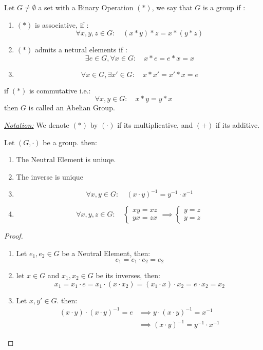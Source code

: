 \begin{definition}[Group]
Let $G \neq \emptyset  $ a set with a Binary Operation $(*)$, we say that 
$G $ is a group if : 
\begin{enumerate}
\item $(*)$ is associative, if : 
  \[
  \forall x,y,z \in  G: \quad (x * y ) * z  = x * (y * z) 
  \]
  \item $(*)  $   admits a netural elements  if :
    \[
      \exists e \in  G, \forall x \in G: \quad 
      x * e = e * x = x
    \]
    \item \[
    \forall x \in  G, \exists x' \in G: \quad  x * x' = 
    x' * x = e
    \]
\end{enumerate}
if $(*)$ is commutative i.e.:
\[
\forall x,y \in  G: \quad x * y = y * x
\]
then $G $ is called an Abelian Group. \\
\end{definition}
\underline{\emph{Notation:}} We denote $(*) $ by $(\cdot)$  if its multiplicative,
and $(+) $ if its additive.
\begin{proposition}
  Let $(G, \cdot )  $ be a group. then:
  \begin{enumerate}
  \item The Neutral Element is uniuqe.
    \item The inverse is unique
      \item \[
      \forall x, y \in  G: \quad (x \cdot  y)^{-1} = y^{-1} \cdot x^{-1}
      \]
      \item 
        \[
        \forall x,y,z \in  G: \quad 
        \begin{cases}
        xy = xz \\
        yx = zx
        \end{cases} 
        \implies 
        \begin{cases}
          y = z \\
          y = z
        \end{cases}
        \]
  \end{enumerate}
\end{proposition}
\begin{proof}
\begin{enumerate}
\item Let $e_1, e_2 \in G $ be a Neutral Element, then: 
  \[
    e_1 = e_1 \cdot e_2 = e_2
  \]
\item 
  let $x \in  G $ and $x_1, x_2 \in  G $ be its inverses, then:
  \[
  x_1 = x_1 \cdot  e = x_1 \cdot  (x \cdot  x_2)  = (x_1 \cdot  x) \cdot  x_2 = e \cdot  x_2 = x_2 
  \]
 \item Let $x, y' \in G $. then:
   \begin{align*}
     (x \cdot y)  \cdot (x \cdot  y) ^{-1} = e & \implies 
     y \cdot (x \cdot y) ^{-1} = x^{-1} \\
                                               & \implies 
                                               (x \cdot  y) ^{-1} = y^{-1} \cdot x^{-1}
   \end{align*}
\end{enumerate}
\end{proof}

